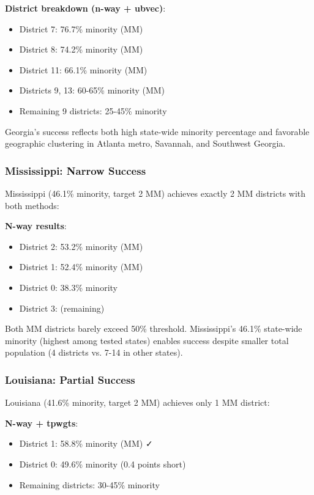 \textbf{District breakdown (n-way + ubvec)}:
\begin{itemize}
\item District 7: 76.7\% minority (MM)
\item District 8: 74.2\% minority (MM)
\item District 11: 66.1\% minority (MM)
\item Districts 9, 13: 60-65\% minority (MM)
\item Remaining 9 districts: 25-45\% minority
\end{itemize}

Georgia's success reflects both high state-wide minority percentage and favorable geographic clustering in Atlanta metro, Savannah, and Southwest Georgia.

\subsubsection{Mississippi: Narrow Success}

Mississippi (46.1\% minority, target 2 MM) achieves exactly 2 MM districts with both methods:

\textbf{N-way results}:
\begin{itemize}
\item District 2: 53.2\% minority (MM)
\item District 1: 52.4\% minority (MM)
\item District 0: 38.3\% minority
\item District 3: (remaining)
\end{itemize}

Both MM districts barely exceed 50\% threshold. Mississippi's 46.1\% state-wide minority (highest among tested states) enables success despite smaller total population (4 districts vs. 7-14 in other states).

\subsubsection{Louisiana: Partial Success}

Louisiana (41.6\% minority, target 2 MM) achieves only 1 MM district:

\textbf{N-way + tpwgts}:
\begin{itemize}
\item District 1: 58.8\% minority (MM) ✓
\item District 0: 49.6\% minority (0.4 points short)
\item Remaining districts: 30-45\% minority
\end{itemize}

